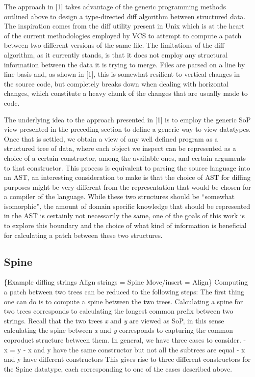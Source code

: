 \documentclass[11pt]{article}
\begin{document}
The approach in {[}1{]} takes advantage of the generic programming
methods outlined above to design a type-directed diff algorithm between
structured data. The inspiration comes from the diff utility present in
Unix which is at the heart of the current methodologies employed by VCS
to attempt to compute a patch between two different versions of the same
file. The limitations of the diff algorithm, as it currently stands, is
that it does not employ any structural information between the data it
is trying to merge. Files are parsed on a line by line basis and, as
shown in {[}1{]}, this is somewhat resilient to vertical changes in the
source code, but completely breaks down when dealing with horizontal
changes, which constitute a heavy chunk of the changes that are usually
made to code.

The underlying idea to the approach presented in {[}1{]} is to employ
the generic SoP view presented in the preceding section to define a
generic way to view datatypes. Once that is settled, we obtain a view of
any well defined program as a structured tree of data, where each object
we inspect can be represented as a choice of a certain constructor,
among the available ones, and certain arguments to that constructor.
This process is equivalent to parsing the source language into an AST,
an interesting consideration to make is that the choice of AST for
diffing purposes might be very different from the representation that
would be chosen for a compiler of the language. While these two
structures should be ``somewhat isomorphic'', the amount of domain
specific knowledge that should be represented in the AST is certainly
not necessarily the same, one of the goals of this work is to explore
this boundary and the choice of what kind of information is beneficial
for calculating a patch between these two structures.

\subsection{Spine}\label{spine}

\{Example diffing strings Align strings = Spine Move/insert = Align\}
Computing a patch between two trees can be reduced to the following
steps: The first thing one can do is to compute a spine between the two
trees. Calculating a spine for two trees corresponds to calculating the
longest common prefix between two strings. Recall that the two trees
\emph{x} and \emph{y} are viewed as SoP, in this sense calculating the
spine between \emph{x} and \emph{y} corresponds to capturing the common
coproduct structure between them. In general, we have three cases to
consider. - x = y - x and y have the same constructor but not all the
subtrees are equal - x and y have different constructors This gives rise
to three different constructors for the Spine datatype, each
corresponding to one of the cases described above.
\end{document}
